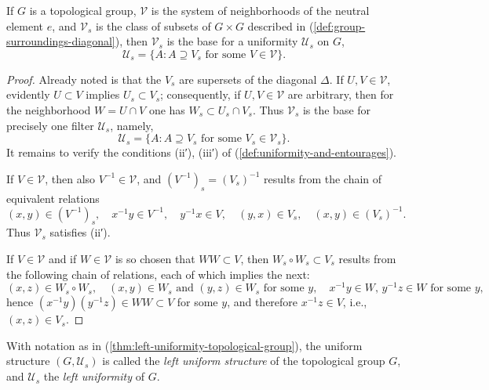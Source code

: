 \begin{theorem}
    \label{thm:left-uniformity-topological-group}

    If \( G \) is a topological group, \( \mathscr{V} \) is the system of neighborhoods of the neutral element \( e \), and \( \mathscr{V}_s \) is the class of subsets of \( G \times G \) described in (\ref{def:group-surroundings-diagonal}), then \( \mathscr{V}_s \) is the base for a uniformity \( \mathscr{U}_s \) on \( G \),
    \[
        \mathscr{U}_s = \{ A : A \supseteq V_s \text{ for some } V \in \mathscr{V} \}.
    \]
\end{theorem}

\begin{proof}
    Already noted is that the \( V_s \) are supersets of the diagonal \( \Delta \).
    If \( U, V \in \mathscr{V} \), evidently \( U \subset V \) implies \( U_s \subset V_s \); consequently, if \( U, V \in \mathscr{V} \) are arbitrary, then for the neighborhood \( W = U \cap V \) one has \( W_s \subset U_s \cap V_s \).
    Thus \( \mathscr{V}_s \) is the base for precisely one filter \( \mathscr{U}_s \), namely,
    \[
        \mathscr{U}_s = \{ A : A \supseteq V_s \text{ for some } V_s \in \mathscr{V}_s \}.
    \]
    It remains to verify the conditions (ii′), (iii′) of (\ref{def:uniformity-and-entourages}).

    If \( V \in \mathscr{V} \), then also \( V^{-1} \in \mathscr{V} \), and \( (V^{-1})_s = (V_s)^{-1} \)
    results from the chain of equivalent relations
    \[
        (x, y) \in (V^{-1})_s, \quad x^{-1}y \in V^{-1}, \quad y^{-1}x \in V, \quad (y, x) \in V_s, \quad (x, y) \in (V_s)^{-1}.
    \]
    Thus \( \mathscr{V}_s \) satisfies (ii′).

    If \( V \in \mathscr{V} \) and if \( W \in \mathscr{V} \) is so chosen that \( WW \subset V \),
    then \( W_s \circ W_s \subset V_s \)
    results from the following chain of relations, each of which implies the next:
    \[
        (x, z) \in W_s \circ W_s, \quad (x, y) \in W_s \text{ and } (y, z) \in W_s \text{ for some } y, \quad x^{-1}y \in W, \, y^{-1}z \in W \text{ for some } y,
    \]
    hence \( (x^{-1}y)(y^{-1}z) \in WW \subset V \) for some \( y \), and therefore \( x^{-1}z \in V \), i.e., \( (x, z) \in V_s \).
\end{proof}


\begin{definition}
    With notation as in (\ref{thm:left-uniformity-topological-group}), the uniform structure \( (G, \mathscr{U}_s) \) is called the \emph{left uniform structure} of the topological group \( G \), and \( \mathscr{U}_s \) the \emph{left uniformity} of \( G \).
\end{definition}

